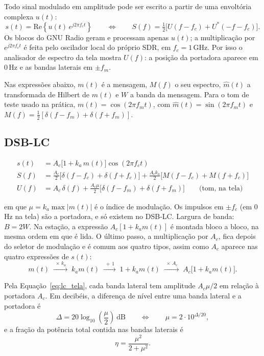 \documentclass[11pt,a4paper]{article}
\begin{document}
Todo sinal modulado em amplitude pode ser escrito a partir de uma envoltória
complexa $u(t)$:
\begin{equation}
      s(t) = \mathrm{Re}\!\left\{u(t)\,e^{j2\pi f_c t}\right\}
      \qquad\Longleftrightarrow\qquad
      S(f) = \tfrac{1}{2}\big[U(f - f_c) + U^{*}(-f - f_c)\big].
      \label{eq:bb}
\end{equation}
Os blocos do GNU Radio geram e processam apenas $u(t)$; a multiplicação por
$e^{j2\pi f_c t}$ é feita pelo oscilador local do próprio SDR, em
$f_c = 1$\,GHz. Por isso o analisador de espectro da tela mostra $U(f)$: a
posição da portadora aparece em $0$\,Hz e as bandas laterais em $\pm f_m$.

Nas expressões abaixo, $m(t)$ é a mensagem, $M(f)$ o seu espectro,
$\hat{m}(t)$ a transformada de Hilbert de $m(t)$ e $W$ a banda da mensagem.
Para o tom de teste usado na prática, $m(t) = \cos(2\pi f_m t)$, com
$\hat{m}(t) = \sin(2\pi f_m t)$ e $M(f) = \tfrac{1}{2}[\delta(f-f_m) + \delta(f+f_m)]$.

\subsection*{DSB-LC}

\begin{align}
      s(t) & = A_c\big[1 + k_a\,m(t)\big]\cos(2\pi f_c t)            \\
      S(f) & = \tfrac{A_c}{2}\big[\delta(f-f_c) + \delta(f+f_c)\big]
      + \tfrac{A_c k_a}{2}\big[M(f-f_c) + M(f+f_c)\big]              \\
      U(f) & = A_c\,\delta(f)
      + \tfrac{A_c\mu}{2}\big[\delta(f-f_m) + \delta(f+f_m)\big]
      \qquad \text{(tom, na tela)}
      \label{eq:lc_tela}
\end{align}

em que $\mu = k_a\max|m(t)|$ é o índice de modulação. Os impulsos em $\pm f_c$
(em $0$\,Hz na tela) são a portadora, e só existem no DSB-LC. Largura de banda:
$B = 2W$. Na estação, a expressão $A_c[1 + k_a m(t)]$ é montada bloco a bloco,
na mesma ordem em que é lida. O último passo, a multiplicação por $A_c$, fica
depois do seletor de modulação e é comum aos quatro tipos, assim como $A_c$
aparece nas quatro expressões de $s(t)$:
\[
      m(t) \;\xrightarrow{\;\times\,k_a\;}\; k_a m(t)
      \;\xrightarrow{\;+\,1\;}\; 1 + k_a m(t)
      \;\xrightarrow{\;\times\,A_c\;}\; A_c\big[1 + k_a m(t)\big].
\]

Pela Equação~\eqref{eq:lc_tela}, cada banda lateral tem amplitude
$A_c\mu/2$ em relação à portadora $A_c$. Em decibéis, a diferença de nível
entre uma banda lateral e a portadora é
\begin{equation}
      \Delta = 20\log_{10}\!\left(\frac{\mu}{2}\right)\ \text{dB}
      \qquad\Longleftrightarrow\qquad
      \mu = 2\cdot 10^{\Delta/20},
      \label{eq:delta}
\end{equation}
e a fração da potência total contida nas bandas laterais é
\begin{equation}
      \eta = \frac{\mu^2}{2 + \mu^2}.
\end{equation}
\end{document}
